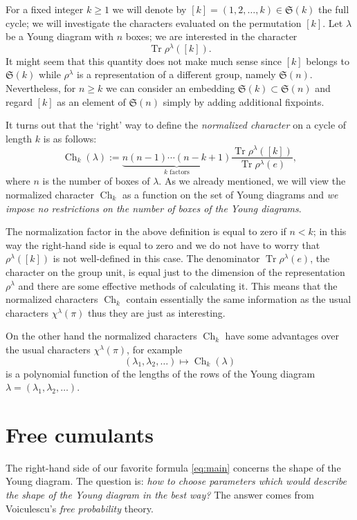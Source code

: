 \documentclass{emsprocart}
\theoremstyle{definition}
\begin{document}
For a fixed integer $k\geq 1$ we will denote by 
$[k]=(1,2,\dots,k)\in {\mathfrak{S}({k})}$ the full cycle; we will investigate the characters evaluated on the permutation
$[k]$. 
Let $\lambda$ be a Young diagram with $n$ boxes; we are interested in the character
$$ \operatorname{Tr} \rho^{\lambda}([k]). $$
It might seem that this quantity does not make much sense since $[k]$ belongs to ${\mathfrak{S}({k})}$ while $\rho^\lambda$ is a representation of a different group, namely ${\mathfrak{S}({n})}$. Nevertheless, for $n\geq k$ we can consider an embedding
${\mathfrak{S}({k})}\subset{\mathfrak{S}({n})}$ and regard $[k]$ as an element of ${\mathfrak{S}({n})}$ simply by adding additional fixpoints.

It turns out that the `right' way to define the \emph{normalized character} on a cycle of length $k$ is as follows:
$$ \operatorname{Ch}_k(\lambda) := \underbrace{n (n-1) \cdots (n-k+1)}_{\text{$k$ factors}} \frac{\operatorname{Tr} \rho^\lambda([k])}{\operatorname{Tr} \rho^\lambda(e)}, $$
where $n$ is the number of boxes of $\lambda$. As we already mentioned, we will view the normalized character
$\operatorname{Ch}_k$ as a function on the set of Young diagrams and \emph{we impose no restrictions on the
number of boxes of the Young diagrams}.

The normalization factor in the above definition 
is equal to zero if $n<k$; in this way the right-hand side is equal to zero and we do not have to worry that $\rho^\lambda([k])$ is not well-defined in this case. 
The denominator $\operatorname{Tr} \rho^\lambda(e)$, the character on the group unit, is equal just to the dimension of the representation $\rho^\lambda$ and there are some effective methods of calculating it.
This means that the normalized characters $\operatorname{Ch}_k$ contain essentially the same information as the usual characters 
$\chi^\lambda(\pi)$ thus they are just as interesting.

On the other hand the normalized characters $\operatorname{Ch}_k$ have some advantages over the usual characters $\chi^\lambda(\pi)$,
for example
$$ (\lambda_1,\lambda_2,\dots) \mapsto \operatorname{Ch}_k(\lambda) $$
is a polynomial function of the lengths of the rows of the Young diagram $\lambda=(\lambda_1,\lambda_2,\dots)$.

\section{Free cumulants}

The right-hand side of our favorite formula \eqref{eq:main} concerns the shape of the Young diagram.
The question is: \emph{how to choose parameters which would describe the shape of the Young diagram
in the best way?}  The answer comes from Voiculescu's \emph{free probability} theory.
\end{document}
